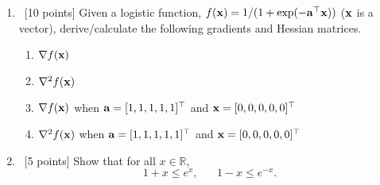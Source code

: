 \documentclass[12pt, fullpage,letterpaper]{article}
\begin{document}
\begin{enumerate}
\item~[10 points]   Given a logistic function, $f({\bf x}) = 1/(1+\exp(-{\bf a}^\top {\bf x}))$ (${\bf x}$ is a vector), derive/calculate the following gradients and Hessian matrices.  
\begin{enumerate}
\item $\nabla f({\bf x})$
\item $\nabla^2 f({\bf x})$
\item $\nabla f({\bf x})$ when ${\bf a} = [1,1,1,1,1]^\top$ and ${\bf x} = [0,0,0,0,0]^\top$
\item $\nabla^2 f({\bf x})$  when ${\bf a} = [1,1,1,1,1]^\top$ and ${\bf x} = [0,0,0,0,0]^\top$
\end{enumerate}

\item~[5 points] Show that for all $x \in \mathbb{R}$, 
\[1+x \le e^x, \;\;\;\;\;\; 1-x \le e^{-x}.
\]

\end{enumerate}
\end{document}
